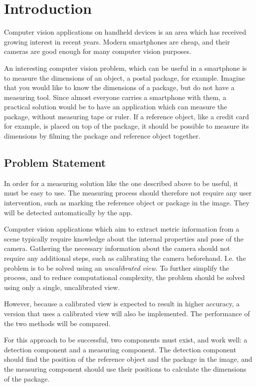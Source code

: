 \chapter{Introduction}
Computer vision applications on handheld devices is an area which has received growing interest in recent years. 
Modern smartphones are cheap, and their cameras are good enough for many computer vision purposes.

An interesting computer vision problem, which can be useful in a smartphone is to measure the dimensions of an object, a postal package, for example.
Imagine that you would like to know the dimensions of a package, but do not have a measuring tool.
Since almost everyone carries a smartphone with them, a practical solution would be to have an application which can measure the package, without measuring tape or ruler.
If a reference object, like a credit card for example, is placed on top of the package, it should be possible to measure its dimensions by filming the package and reference object together.

\section{Problem Statement}\label{problem-statement}
In order for a measuring solution like the one described above to be useful, it must be easy to use. 
The measuring process should therefore not require any user intervention, such as marking the reference object or package in the image. They will be detected automatically by the app.

Computer vision applications which aim to extract metric information from a scene typically require knowledge about the internal properties and pose of the camera.
Gathering the necessary information about the camera should not require any additional steps, such as calibrating the camera beforehand.
I.e. the problem is to be solved using an \textit{uncalibrated view}.
To further simplify the process, and to reduce computational complexity, the problem should be solved using only a single, uncalibrated view.

However, because a calibrated view is expected to result in higher accuracy, a version that uses a calibrated view will also be implemented.
The performance of the two methods will be compared.

For this approach to be successful, two components must exist, and work well: a detection component and a measuring component.
The detection component should find the position of the reference object and the package in the image, and the measuring component should use their positions to calculate the dimensions of the package.


